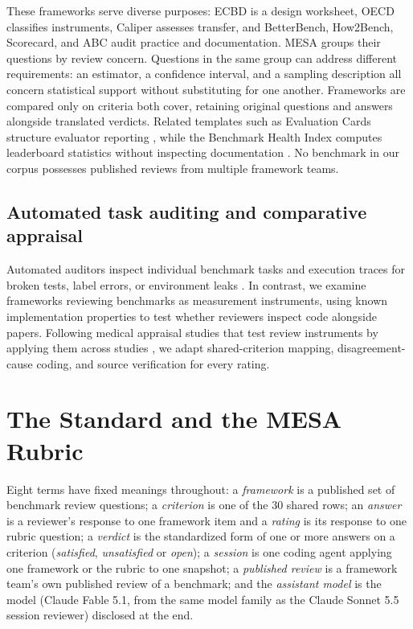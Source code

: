 \documentclass[10pt,conference]{IEEEtran}
\begin{document}
These frameworks serve diverse purposes: ECBD is a design worksheet, OECD classifies instruments, Caliper assesses transfer, and BetterBench, How2Bench, Scorecard, and ABC audit practice and documentation. MESA groups their questions by review concern. Questions in the same group can address different requirements: an estimator, a confidence interval, and a sampling description all concern statistical support without substituting for one another. Frameworks are compared only on criteria both cover, retaining original questions and answers alongside translated verdicts. Related templates such as Evaluation Cards structure evaluator reporting \cite{ghosh_evaluation_cards_2026}, while the Benchmark Health Index computes leaderboard statistics without inspecting documentation \cite{zhu_benchmark_health_index_2026}. No benchmark in our corpus possesses published reviews from multiple framework teams.

\subsection{Automated task auditing and comparative appraisal}
Automated auditors inspect individual benchmark tasks and execution traces for broken tests, label errors, or environment leaks \cite{tu_benchguard_2026,wang_auto_benchmark_audit_2026,suh_agentsuite_2026,mohl_transcript_flaws_2026,skarlinski_futurehouse_hle_2025}. In contrast, we examine frameworks reviewing benchmarks as measurement instruments, using known implementation properties to test whether reviewers inspect code alongside papers. Following medical appraisal studies that test review instruments by applying them across studies \cite{hartling_rand_2012,woelfle_appraisal_llm_2024,vanderkuil_checklist_disagreement_2026,dashti_quadas2_2026}, we adapt shared-criterion mapping, disagreement-cause coding, and source verification for every rating.

\section{The Standard and the MESA Rubric}
Eight terms have fixed meanings throughout: a \emph{framework} is a published set of benchmark review questions; a \emph{criterion} is one of the 30 shared rows; an \emph{answer} is a reviewer's response to one framework item and a \emph{rating} is its response to one rubric question; a \emph{verdict} is the standardized form of one or more answers on a criterion (\emph{satisfied}, \emph{unsatisfied} or \emph{open}); a \emph{session} is one coding agent applying one framework or the rubric to one snapshot; a \emph{published review} is a framework team's own published review of a benchmark; and the \emph{assistant model} is the model (Claude Fable 5.1, from the same model family as the Claude Sonnet 5.5 session reviewer) disclosed at the end.
\end{document}
